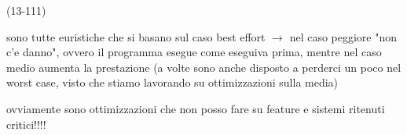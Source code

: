 (13-111)

sono tutte euristiche che si basano sul caso best effort $\rightarrow$ nel caso peggiore "non c'e danno", ovvero il programma esegue come eseguiva prima, mentre nel caso medio aumenta la prestazione (a volte sono anche disposto a perderci un poco nel worst case, visto che stiamo lavorando su ottimizzazioni sulla media) 

ovviamente sono ottimizzazioni che non posso fare su feature e sistemi ritenuti critici!!!!


